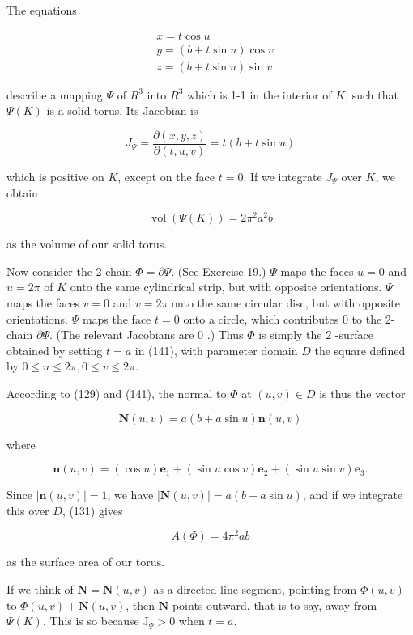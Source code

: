 \documentclass[10pt]{article}
\begin{document}
The equations

$$
\begin{aligned}
& x=t \cos u \\
& y=(b+t \sin u) \cos v \\
& z=(b+t \sin u) \sin v
\end{aligned}
$$

describe a mapping $\Psi$ of $R^{3}$ into $R^{3}$ which is 1-1 in the interior of $K$, such that $\Psi(K)$ is a solid torus. Its Jacobian is

$$
J_{\Psi}=\frac{\partial(x, y, z)}{\partial(t, u, v)}=t(b+t \sin u)
$$

which is positive on $K$, except on the face $t=0$. If we integrate $J_{\Psi}$ over $K$, we obtain

$$
\operatorname{vol}(\Psi(K))=2 \pi^{2} a^{2} b
$$

as the volume of our solid torus.

Now consider the 2-chain $\Phi=\partial \Psi$. (See Exercise 19.) $\Psi$ maps the faces $u=0$ and $u=2 \pi$ of $K$ onto the same cylindrical strip, but with opposite orientations. $\Psi$ maps the faces $v=0$ and $v=2 \pi$ onto the same circular disc, but with opposite orientations. $\Psi$ maps the face $t=0$ onto a circle, which contributes 0 to the 2-chain $\partial \Psi$. (The relevant Jacobians are 0 .) Thus $\Phi$ is simply the 2 -surface obtained by setting $t=a$ in (141), with parameter domain $D$ the square defined by $0 \leq u \leq 2 \pi, 0 \leq v \leq 2 \pi$.

According to (129) and (141), the normal to $\Phi$ at $(u, v) \in D$ is thus the vector

$$
\mathbf{N}(u, v)=a(b+a \sin u) \mathbf{n}(u, v)
$$

where

$$
\mathbf{n}(u, v)=(\cos u) \mathbf{e}_{1}+(\sin u \cos v) \mathbf{e}_{2}+(\sin u \sin v) \mathbf{e}_{3} .
$$

Since $|\mathbf{n}(u, v)|=1$, we have $|\mathbf{N}(u, v)|=a(b+a \sin u)$, and if we integrate this over $D$, (131) gives

$$
A(\Phi)=4 \pi^{2} a b
$$

as the surface area of our torus.

If we think of $\mathbf{N}=\mathbf{N}(u, v)$ as a directed line segment, pointing from $\Phi(u, v)$ to $\Phi(u, v)+\mathbf{N}(u, v)$, then $\mathbf{N}$ points outward, that is to say, away from $\Psi(K)$. This is so because $\mathrm{J}_{\Psi}>0$ when $t=a$.
\end{document}
